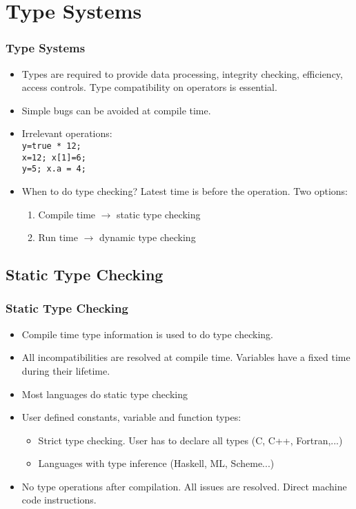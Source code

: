 \section{Type Systems}
\begin{frame}
\frametitle{Type Systems}
 \begin{itemize}[<+->]
  \item Types are required to provide data processing, integrity checking, efficiency, access
  controls. Type compatibility on operators is essential.
\item Simple bugs can be avoided at compile time.
\item Irrelevant operations:\\
	\texttt{y=true * 12;\\
	x=12; x[1]=6;\\
	y=5; x.a = 4;}
\item When to do type checking? Latest time is before the operation. Two options:
\begin{enumerate}
 \item Compile time $\rightarrow$ static type checking
 \item Run time  $\rightarrow$ dynamic type checking
\end{enumerate}
 \end{itemize}
\end{frame}

\subsection{Static Type Checking}
\begin{frame}
 \frametitle{Static Type Checking}
\begin{itemize}[<+->]
 \item  Compile time type information is used to do type checking.
 \item All incompatibilities are resolved at compile time. Variables
 	have a fixed time during their lifetime.
\item  Most languages do static type checking
 \item User defined constants, variable and function types:
	\begin{itemize}
	\item Strict type checking. User has to declare all types (C, C++, Fortran,...)
	\item Languages with type inference (Haskell, ML, Scheme...)
	\end{itemize}
 \item No type operations after compilation. All issues are resolved. Direct machine code
 instructions.
\end{itemize}
\end{frame}

